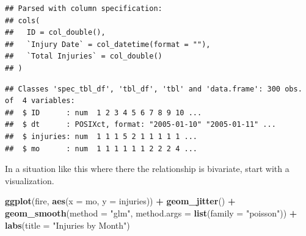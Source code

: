 \documentclass[
]{book}
\newenvironment{Shaded}{\begin{snugshade}}{\end{snugshade}}
\newcommand{\DataTypeTok}[1]{\textcolor[rgb]{0.13,0.29,0.53}{#1}}
\newcommand{\DecValTok}[1]{\textcolor[rgb]{0.00,0.00,0.81}{#1}}
\newcommand{\KeywordTok}[1]{\textcolor[rgb]{0.13,0.29,0.53}{\textbf{#1}}}
\newcommand{\NormalTok}[1]{#1}
\newcommand{\OperatorTok}[1]{\textcolor[rgb]{0.81,0.36,0.00}{\textbf{#1}}}
\newcommand{\StringTok}[1]{\textcolor[rgb]{0.31,0.60,0.02}{#1}}
\begin{document}
\begin{verbatim}
## Parsed with column specification:
## cols(
##   ID = col_double(),
##   `Injury Date` = col_datetime(format = ""),
##   `Total Injuries` = col_double()
## )
\end{verbatim}

\begin{Shaded}
\end{Shaded}

\begin{verbatim}
## Classes 'spec_tbl_df', 'tbl_df', 'tbl' and 'data.frame': 300 obs. of  4 variables:
##  $ ID      : num  1 2 3 4 5 6 7 8 9 10 ...
##  $ dt      : POSIXct, format: "2005-01-10" "2005-01-11" ...
##  $ injuries: num  1 1 1 5 2 1 1 1 1 1 ...
##  $ mo      : num  1 1 1 1 1 1 2 2 2 4 ...
\end{verbatim}

In a situation like this where there the relationship is bivariate, start with a visualization.

\begin{Shaded}
\begin{Highlighting}[]
\KeywordTok{ggplot}\NormalTok{(fire, }\KeywordTok{aes}\NormalTok{(}\DataTypeTok{x =}\NormalTok{ mo, }\DataTypeTok{y =}\NormalTok{ injuries)) }\OperatorTok{+}
\StringTok{  }\KeywordTok{geom_jitter}\NormalTok{() }\OperatorTok{+}
\StringTok{  }\KeywordTok{geom_smooth}\NormalTok{(}\DataTypeTok{method =} \StringTok{"glm"}\NormalTok{, }\DataTypeTok{method.args =} \KeywordTok{list}\NormalTok{(}\DataTypeTok{family =} \StringTok{"poisson"}\NormalTok{)) }\OperatorTok{+}
\StringTok{  }\KeywordTok{labs}\NormalTok{(}\DataTypeTok{title =} \StringTok{"Injuries by Month"}\NormalTok{)}
\end{Highlighting}
\end{Shaded}
\end{document}
